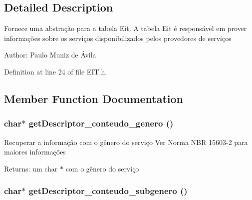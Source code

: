 \subsection{Detailed Description}
Fornece uma abstração para a tabela Eit. A tabela Eit é responsável em prover informações sobre os serviços disponibilizados pelos provedores de serviços

\begin{Desc}
\item[Author:]Paulo Muniz de Ávila \end{Desc}




Definition at line 24 of file EIT.h.

\subsection{Member Function Documentation}
\subsubsection{\setlength{\rightskip}{0pt plus 5cm}char$\ast$ getDescriptor\_\-conteudo\_\-genero ()}\label{classbr_1_1ufscar_1_1lince_1_1ginga_1_1recommender_1_1eit_b0f42d3823679a4a1f7039480e9bb727}


Recuperar a informação com o gênero do serviço Ver Norma NBR 15603-2 para maiores informações \begin{Desc}
\item[Returns:]um char $\ast$ com o gênero do serviço \end{Desc}
\subsubsection{\setlength{\rightskip}{0pt plus 5cm}char$\ast$ getDescriptor\_\-conteudo\_\-subgenero ()}\label{classbr_1_1ufscar_1_1lince_1_1ginga_1_1recommender_1_1eit_fb2a6d488e1e54b7f704d2f6ec5dca5c}


